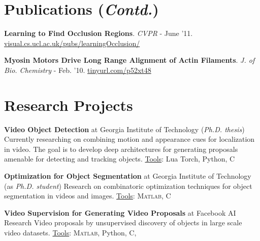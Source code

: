 \documentclass[10pt,twoside,a4paper]{article}
\newif\ifdetail
\newcommand\CPP{C\nolinebreak[4]\hspace{-.05em}\raisebox{.4ex}{\relsize{-3}{\textbf{++}}}}
\begin{document}
\section{Publications {\small(\textit{Contd.})}}
{
\small
\fi

\textbf{Learning to Find Occlusion Regions}. \ifdetail ($1^{\text{st}}$ author) \newline \fi \textit{\ifdetail IEEE Conference on Computer Vision and Pattern Recognition (CVPR) \else CVPR \fi} - June '11. \href{http://visual.cs.ucl.ac.uk/pubs/learningOcclusion/}{visual.cs.ucl.ac.uk/pubs/learningOcclusion/}

\textbf{Myosin Motors Drive Long Range Alignment of Actin Filaments}. \ifdetail ($3^{\text{rd}}$ author) \newline \fi \textit{\ifdetail Journal of Biological Chemistry \else J. of Bio. Chemistry \fi} - Feb. '10. \href{http://www.jbc.org/content/285/7/4964.abstract}{\ifdetail www.jbc.org/content/285/7/4964.abstract \else tinyurl.com/p52xt48 \fi}
}

\ifdetail
\else
\vspace{-0.4cm}
\fi


\section{Research Projects}
\textbf{Video Object Detection} at Georgia Institute of Technology (\textit{Ph.D. thesis}) \newline
Currently researching on combining motion and appearance cues for localization in video. The goal is to develop deep architectures for generating proposals amenable for detecting and tracking objects. \underline{Tools}: Lua Torch, Python, \CPP

\textbf{Optimization for Object Segmentation} at Georgia Institute of Technology (as \textit{Ph.D. student}) \newline
Research on combinatoric optimization techniques for object segmentation in videos and images. \underline{Tools}: \textsc{Matlab}, \CPP

\textbf{Video Supervision for Generating Video Proposals} at Facebook AI Research \newline
\ifdetail Research on generating video \else Video \fi proposals by unsupervised discovery of objects in large scale video datasets. \underline{Tools}: \textsc{Matlab}, Python, \CPP, \ifdetail Javascript, PHP \fi

\ifdetail
\textbf{Object Proposals for CT Images} at Georgia Institute of Technology (as \textit{Ph.D. student}) \newline
Supervising a project for generating segmentation proposals in 3D CT scans, leading to detection of organs.
\fi
\end{document}

